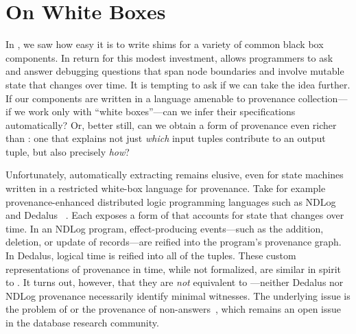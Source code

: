 \section{On White Boxes}
In , we saw how easy it is to write shims for a variety of
common black box components. In return for this modest investment, \fluent{}
allows programmers to ask and answer debugging questions that span node
boundaries and involve mutable state that changes over time. It is tempting to
ask if we can take the idea further. If our components are written in a
language amenable to provenance collection---if we work only with ``white boxes''---can we infer their \watprovenance{}
specifications automatically? Or, better still, can we obtain a form of
provenance even richer than \watprovenance{}: one that explains not just
\emph{which} input tuples contribute to an output tuple, but also precisely
\emph{how}?

Unfortunately, automatically extracting \watprovenance{} remains elusive, even
for state machines written in a restricted white-box language for provenance. Take for example
provenance-enhanced distributed logic programming languages such as
NDLog~\cite{loo2006design} and Dedalus~\cite{alvaro2011dedalus} . Each exposes a
form of \whyprovenance{} that accounts for state that changes over time. In an
NDLog program, effect-producing events---such as the addition, deletion, or update of
records---are reified into the program's provenance graph. In Dedalus, logical
time is reified into all of the tuples.  These custom representations of
provenance in time, while not formalized, are similar in spirit to
\watprovenance{}. It turns out, however, that they are \emph{not} equivalent to
\watprovenance{}---neither Dedalus nor NDLog provenance necessarily identify minimal
witnesses. The underlying issue is the problem of 
or the provenance of non-answers~\cite{chapman2009whynot,huang2008nonanswers},
which remains an open issue in the database research community.

\newcommand{\kvset}{\text{set}}
\newcommand{\kvget}{\text{get}}
\newcommand{\freeze}{\text{freeze}}
\newcommand{\trunc}{\text{trunc}}

